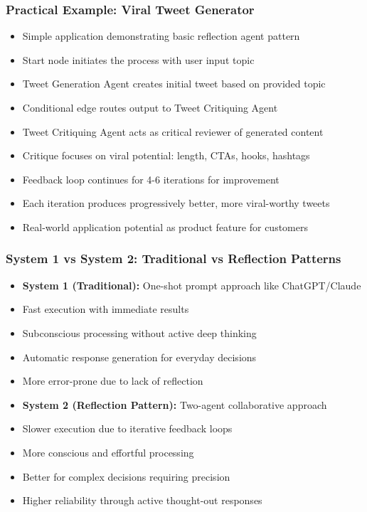 \begin{frame}[fragile]\frametitle{Practical Example: Viral Tweet Generator}
      \begin{itemize}
        \item Simple application demonstrating basic reflection agent pattern
        \item Start node initiates the process with user input topic
        \item Tweet Generation Agent creates initial tweet based on provided topic
        \item Conditional edge routes output to Tweet Critiquing Agent
        \item Tweet Critiquing Agent acts as critical reviewer of generated content
        \item Critique focuses on viral potential: length, CTAs, hooks, hashtags
        \item Feedback loop continues for 4-6 iterations for improvement
        \item Each iteration produces progressively better, more viral-worthy tweets
        \item Real-world application potential as product feature for customers
      \end{itemize}
\end{frame}

\begin{frame}[fragile]\frametitle{System 1 vs System 2: Traditional vs Reflection Patterns}
      \begin{itemize}
        \item \textbf{System 1 (Traditional):} One-shot prompt approach like ChatGPT/Claude
        \item Fast execution with immediate results
        \item Subconscious processing without active deep thinking
        \item Automatic response generation for everyday decisions
        \item More error-prone due to lack of reflection
        \item \textbf{System 2 (Reflection Pattern):} Two-agent collaborative approach
        \item Slower execution due to iterative feedback loops
        \item More conscious and effortful processing
        \item Better for complex decisions requiring precision
        \item Higher reliability through active thought-out responses
      \end{itemize}
\end{frame}

